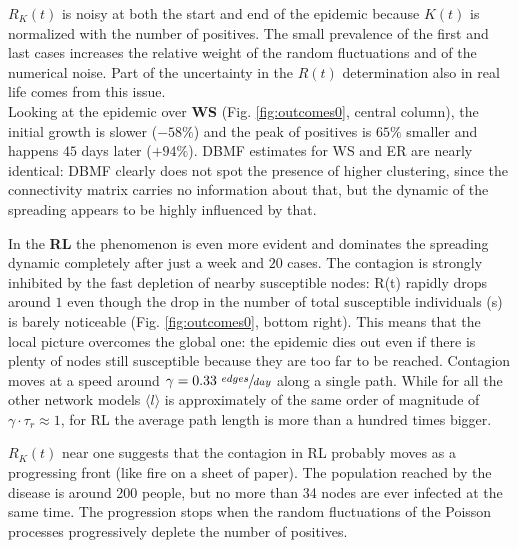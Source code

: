 \documentclass[DIV=12, BCOR=0pt]{scrartcl}  %
\begin{document}
  $R_K(t)$ is noisy at both the start and end of the epidemic because $K(t)$ is normalized with the number of positives.
  The small prevalence of the first and last cases increases the relative weight of the random fluctuations and of the numerical noise. Part of the uncertainty in the $R(t)$ determination also in real life comes from this issue.\\
  
  Looking at the epidemic over \textbf{WS} (Fig. \ref{fig:outcomes0}, central column), the initial growth is slower ($- 58 \%$) and the peak of positives is $65 \%$ smaller and happens $45$ days later ($+ 94 \%$). DBMF estimates for WS and ER are nearly identical: DBMF clearly does not spot the presence of higher clustering, since the connectivity matrix carries no information about that, but the dynamic of the spreading appears to be highly influenced by that.
  
  In the \textbf{RL} the phenomenon is even more evident and dominates the spreading dynamic completely after just a week and $20$ cases. The contagion is strongly inhibited by the fast depletion of nearby susceptible nodes: R(t) rapidly drops around $1$ even though the drop in the number of total susceptible individuals (s) is barely noticeable (Fig. \ref{fig:outcomes0}, bottom right). This means that the local picture overcomes the global one: the epidemic dies out even if there is plenty of nodes still susceptible because they are too far to be reached. Contagion moves at a speed around $\gamma = 0.33 \ \sfrac{edges}{day}$ along a single path. While for all the other network models $\langle l \rangle $ is approximately of the same order of magnitude of $\gamma \cdot \tau_r \approx 1 $, for RL the average path length is more than a hundred times bigger.
  
  $R_K(t)$ near one suggests that the contagion in RL probably moves as a progressing front (like fire on a sheet of paper). The population reached by the disease is around 200 people, but no more than 34 nodes are ever infected at the same time. The progression stops when the random fluctuations of the Poisson processes progressively deplete the number of positives.\\
  
\end{document}
